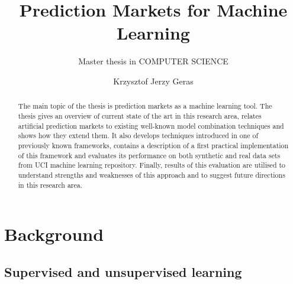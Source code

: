 \documentclass[a4paper,12pt,times,numbered,print,index]{Classes/PhDThesisPSnPDF}
\title{Prediction Markets for Machine Learning}
\subtitle{Master thesis in COMPUTER SCIENCE}
\author{Krzysztof Jerzy Geras}
\begin{document}
\frontmatter

\maketitle



\begin{abstract}
The main topic of the thesis is prediction markets as a machine learning tool. The thesis gives
an overview of current state of the art in this research area, relates artificial prediction markets
to existing well-known model combination techniques and shows how they extend them.
It also develops techniques introduced in one of previously known frameworks, contains a
description of a first practical implementation of this framework and evaluates its performance
on both synthetic and real data sets from UCI machine learning repository. Finally, results
of this evaluation are utilised to understand strengths and weaknesses of this approach and
to suggest future directions in this research area.
\end{abstract}
\clearpage


\tableofcontents

\listoffigures

\listoftables

\printnomenclature

\mainmatter



\chapter{Background}

\graphicspath{{Chapter1/}}

\section{Supervised and unsupervised learning}
\end{document}
